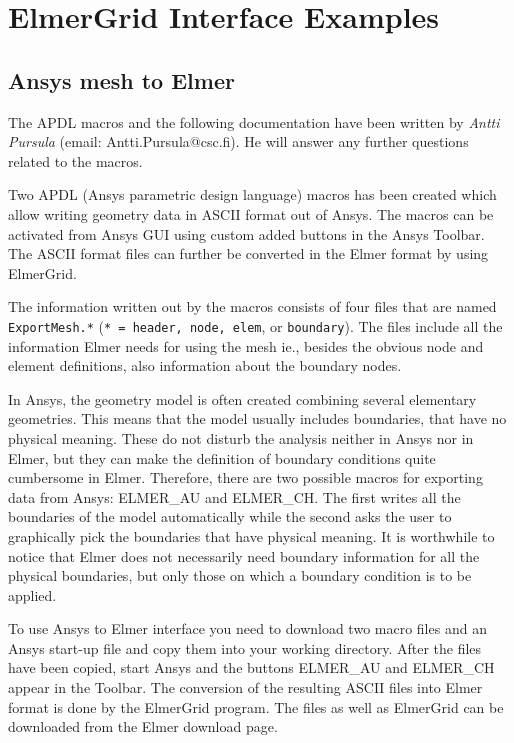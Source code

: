 \chapter{ElmerGrid Interface Examples}

\section{Ansys mesh to Elmer}

The APDL macros and the following documentation have been written
by {\em Antti Pursula} (email: Antti.Pursula@csc.fi). He will 
answer any further questions related to the macros.

Two APDL (Ansys parametric design language) macros has been created
which allow writing geometry data in ASCII format out of Ansys. The
macros can be activated from Ansys GUI using custom added buttons in
the Ansys Toolbar. The ASCII format files can further be converted in
the Elmer format by using ElmerGrid.

The information written out by the macros consists of four files that
are named \texttt{ExportMesh.*} (\texttt{* = header, node, elem}, or
\texttt{boundary}). The files include all the information Elmer needs for using
the mesh ie., besides the obvious node and element definitions, also
information about the boundary nodes. 


In Ansys, the geometry model is often created combining several
elementary geometries. This means that the model usually includes
boundaries, that have no physical meaning. These do not disturb the
analysis neither in Ansys nor in Elmer, but they can make the
definition of boundary conditions quite cumbersome in
Elmer. Therefore, there are two possible macros for exporting data
from Ansys: ELMER\_AU and ELMER\_CH. The first writes all the boundaries
of the model automatically while the second asks the user to
graphically pick the boundaries that have physical meaning. It is
worthwhile to notice that Elmer does not necessarily need boundary
information for all the physical boundaries, but only those on which a
boundary condition is to be applied.

To use Ansys to Elmer interface you need to download two macro files
and an Ansys start-up file and copy them into your working
directory. After the files have been copied, start Ansys and the
buttons ELMER\_AU and ELMER\_CH appear in the Toolbar. The conversion of
the resulting ASCII files into Elmer format is done by the ElmerGrid
program. The files as well as ElmerGrid can be downloaded from the
Elmer download page.


